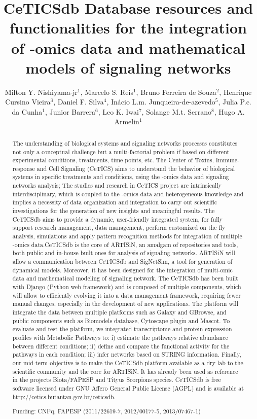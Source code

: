 \documentclass[twoside]{article}
\title{\vspace{-15mm}\fontsize{24pt}{10pt}\selectfont\textbf{CeTICSdb Database resources and functionalities for the integration of -omics data and mathematical models of signaling networks}} %
\author{Milton Y. Nishiyama-jr$^1$, Marcelo S. Reis$^1$, Bruno Ferreira de Souza$^2$, Henrique Cursino Vieira$^3$, Daniel F. Silva$^4$, In\'acio L.m. Junqueira-de-azevedo$^5$, Julia P.c. da Cunha$^1$, Junior Barrera$^6$, Leo K. Iwai$^7$, Solange M.t. Serrano$^8$, Hugo A. Armelin$^1$}
\affil{1 INSTITUTO BUTANTAN\\ 2 ECC-CETICS, INSTITUTO BUTANTAN\\ 3 LECC-CETICS, INSTITUTO BUTANTAN\\ 4 ESCOLA POLIT\'ECNICA, USP S\~AO PAULO\\ 5 LETA-CETICS, INSTITUTO BUTANTAN, S\~AO PAULO, BRAZIL\\ 6 INSTITUTO DE MATEM\'ATICA E ESTAT\'ISTICA, USP\\ 7 LETA-CETICS, INSTITUTO BUTANTAN\\ 8 LETA-CETICS, INSTITUTO BUTANTAN, S\~AO PAULO\\ }
\date{}
\begin{document}
\maketitle %

\thispagestyle{fancy} %


\begin{abstract}
The understanding of biological systems and signaling networks processes constitutes not only a conceptual challenge but a multi-factorial problem if based on different experimental conditions, treatments, time points, etc. The Center of Toxins, Immune-response and Cell Signaling (CeTICS) aims to understand the behavior of biological systems in specific treatments and conditions, using the -omics data and signaling networks analysis; The studies and research in CeTICS project are intrinsically interdisciplinary, which is coupled to the -omics data and heterogeneous knowledge and implies a necessity of data organization and integration to carry out scientific investigations for the generation of new insights and meaningful results. The CeTICSdb aims to provide a dynamic, user-friendly integrated system, for fully support research management, data management, perform customized on the fly analysis, simulations and apply pattern recognition methods for integration of multiple -omics data.CeTICSdb is the core of ARTISiN, an amalgam of repositories and tools, both public and in-house built ones for analysis of signaling networks. ARTISiN will allow a communication between CeTICSdb and SigNetSim, a tool for generation of dynamical models. Moreover, it has been designed for the integration of multi-omic data and mathematical modeling of signaling network. The CeTICSdb has been built with Django (Python web framework) and is composed of multiple components, which will allow to efficiently evolving it into a data management framework, requiring fewer manual changes, especially in the development of new applications. The platform will integrate the data between multiple platforms such as Galaxy and GBrowse, and public components such as Biomodels database, Cytoscape plugin and Mascot. To evaluate and test the platform, we integrated transcriptome and protein expression profiles with Metabolic Pathways to: i) estimate the pathways relative abundance between different conditions; ii) define and compare the functional activity for the pathways in each condition; iii) infer networks based on STRING information. 
Finally, our mid-term objective is to make the CeTICSdb platform available as a dry lab to the scientific community and the core for ARTISiN. It has already been used as reference in the projects Biota/FAPESP and Tityus Scorpions species. CeTICSdb is free software licensed under GNU Affero General Public License (AGPL) and is available at http://cetics.butantan.gov.br/ceticsdb.

Funding: CNPq, FAPESP (2011/22619-7,  2012/00177-5,  2013/07467-1)
\end{abstract}
\end{document}
